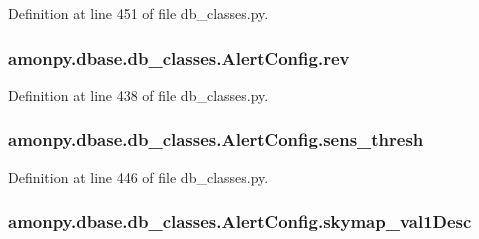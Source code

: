 Definition at line 451 of file db\-\_\-classes.\-py.

\hypertarget{classamonpy_1_1dbase_1_1db__classes_1_1_alert_config_a73ac175f4751ace5efefa98ccbfc0785}{
\subsubsection[{rev}]{\setlength{\rightskip}{0pt plus 5cm}amonpy.\-dbase.\-db\-\_\-classes.\-Alert\-Config.\-rev}}\label{classamonpy_1_1dbase_1_1db__classes_1_1_alert_config_a73ac175f4751ace5efefa98ccbfc0785}


Definition at line 438 of file db\-\_\-classes.\-py.

\hypertarget{classamonpy_1_1dbase_1_1db__classes_1_1_alert_config_acfdfd05a7551c6ee13a4c04970a5b496}{
\subsubsection[{sens\-\_\-thresh}]{\setlength{\rightskip}{0pt plus 5cm}amonpy.\-dbase.\-db\-\_\-classes.\-Alert\-Config.\-sens\-\_\-thresh}}\label{classamonpy_1_1dbase_1_1db__classes_1_1_alert_config_acfdfd05a7551c6ee13a4c04970a5b496}


Definition at line 446 of file db\-\_\-classes.\-py.

\hypertarget{classamonpy_1_1dbase_1_1db__classes_1_1_alert_config_a73eaa3edce9df7437c2f385e5ffcdc27}{
\subsubsection[{skymap\-\_\-val1\-Desc}]{\setlength{\rightskip}{0pt plus 5cm}amonpy.\-dbase.\-db\-\_\-classes.\-Alert\-Config.\-skymap\-\_\-val1\-Desc}}\label{classamonpy_1_1dbase_1_1db__classes_1_1_alert_config_a73eaa3edce9df7437c2f385e5ffcdc27}



